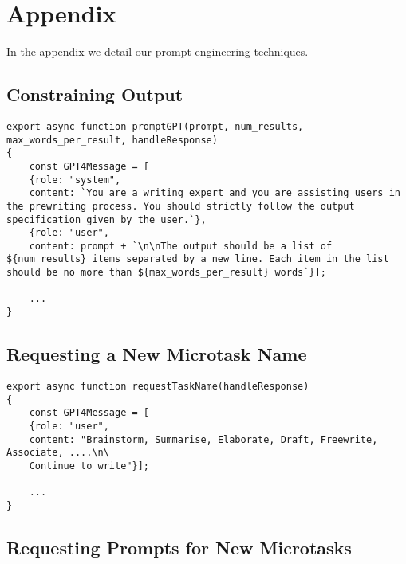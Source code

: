\section{Appendix}
In the appendix we detail our prompt engineering techniques.

\subsection{Constraining Output}


\begin{verbatim}
export async function promptGPT(prompt, num_results, max_words_per_result, handleResponse)
{
    const GPT4Message = [
    {role: "system",
    content: `You are a writing expert and you are assisting users in the prewriting process. You should strictly follow the output specification given by the user.`},
    {role: "user",
    content: prompt + `\n\nThe output should be a list of ${num_results} items separated by a new line. Each item in the list should be no more than ${max_words_per_result} words`}];

    ...
}
\end{verbatim}

\label{appendix_newtask}
\subsection{Requesting a New Microtask Name}

\begin{verbatim}
export async function requestTaskName(handleResponse)
{
    const GPT4Message = [
    {role: "user",
    content: "Brainstorm, Summarise, Elaborate, Draft, Freewrite, Associate, ....\n\
    Continue to write"}];

    ...
}
\end{verbatim}

\subsection{Requesting Prompts for New Microtasks}

